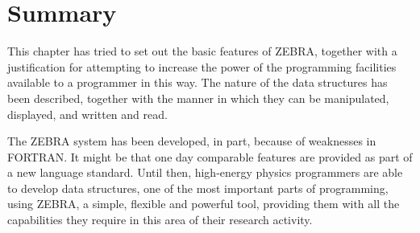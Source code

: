 \section{Summary}
\par
This chapter has tried to set out the basic features of ZEBRA, together
with a justification for attempting to increase the power of the
programming facilities available to a programmer in this way. The nature
of the data structures has been described, together with the manner
in which they
can be manipulated, displayed, and written and read.
\par
The ZEBRA system has been developed, in part, because of weaknesses in
FORTRAN. It might be that one day comparable
features are provided as part
of a new language standard.
Until then, high-energy physics programmers are able
to develop data structures, one of the most important parts of
programming, using ZEBRA,
a simple, flexible and powerful tool,
providing them with all
the capabilities they require in this area of their research activity.
 
